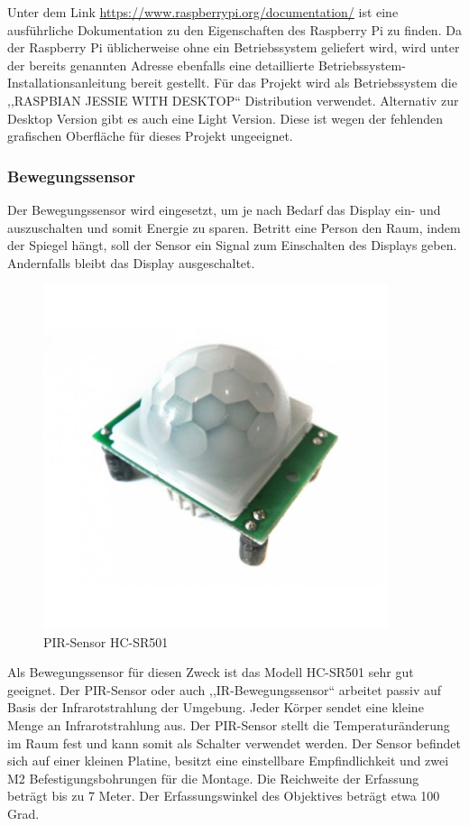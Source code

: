 Unter dem Link \url{https://www.raspberrypi.org/documentation/} ist eine ausführliche Dokumentation zu den Eigenschaften des Raspberry Pi zu finden. Da der Raspberry Pi üblicherweise ohne ein Betriebssystem geliefert wird, wird unter der bereits genannten Adresse ebenfalls eine detaillierte Betriebssystem-Installationsanleitung bereit gestellt. Für das Projekt wird als Betriebssystem die ,,RASPBIAN JESSIE WITH DESKTOP`` Distribution verwendet. Alternativ zur Desktop Version gibt es auch eine Light Version. Diese ist wegen der fehlenden grafischen Oberfläche für dieses Projekt ungeeignet.

\subsubsection*{Bewegungssensor}
Der Bewegungssensor wird eingesetzt, um je nach Bedarf das Display ein- und auszuschalten und somit Energie zu sparen. Betritt eine Person den Raum, indem der Spiegel hängt, soll  der Sensor ein Signal zum Einschalten des Displays geben. Andernfalls bleibt das Display ausgeschaltet. 

	\begin{figure}
		\includegraphics[width=0.9\textwidth]{bilder/PIR-Sensor.jpg}
		\caption{PIR-Sensor HC-SR501}
	\end{figure}	
Als Bewegungssensor für diesen Zweck ist das Modell HC-SR501 sehr gut geeignet. Der PIR-Sensor oder auch ,,IR-Bewegungssensor`` arbeitet passiv auf Basis der Infrarotstrahlung der Umgebung. Jeder Körper sendet eine kleine Menge an Infrarotstrahlung aus. Der PIR-Sensor stellt die Temperaturänderung im Raum fest und kann somit als Schalter verwendet werden. Der Sensor befindet sich auf einer kleinen Platine, besitzt eine einstellbare Empfindlichkeit und zwei M2 Befestigungsbohrungen für die Montage. Die Reichweite der Erfassung beträgt bis zu 7 Meter. Der Erfassungswinkel des Objektives beträgt etwa 100 Grad. 

